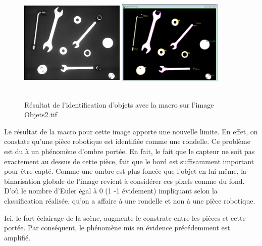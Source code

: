 \documentclass{scrreprt}
\begin{document}
\begin{figure}[!h]
\centering
\includegraphics[width=5cm, height=5cm]{images/objet2o.png}\hfill
\includegraphics[width=5cm, height=5cm]{images/objet2.png}
\caption{Résultat de l'identification d'objets avec la macro sur l'image Objets2.tif}
\end{figure}

Le résultat de la macro pour cette image apporte une nouvelle limite. En effet, on
constate qu'une pièce robotique est identifiée comme une rondelle. Ce problème est du
à un phénomène d'ombre portée. En fait, le fait que le capteur ne soit pas exactement 
au dessus de cette pièce, fait que le bord est suffisamment important pour être capté.
Comme une ombre est plus foncée que l'objet en lui-même, la binarisation globale de l'image
revient à considérer ces pixels comme du fond. D'où le nombre d'Euler égal à 0 (1 -1 évidement)
impliquant selon la classification réalisée, qu'on a affaire à une rondelle et non à 
une pièce robotique.  


\newpage
Ici, le fort éclairage de la scène, augmente le constrate entre les pièces et cette portée.
Par conséquent, le phénomène mis en évidence précédemment est amplifié. 
\end{document}
